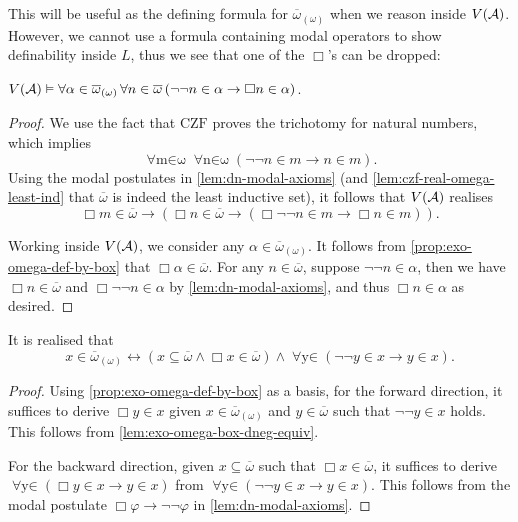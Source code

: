 \documentclass[12pt,openany]{book}
\theoremstyle{plain}
\theoremstyle{definition}
\newcommand\opA[1]{\mathop{\forall #1}}
\newcommand\CZF{\mathrm{CZF}}
\begin{document}
This will be useful as the defining formula for $\overline{\omega}_{(\omega)}$ when we reason inside $V\mleft(\mathcal{A}\mright)$. However, we cannot use a formula containing modal operators to show definability inside $L$, thus we see that one of the $\Box$'s can be dropped:

\begin{lemma}
  \label{lem:exo-omega-box-dneg-equiv}
  $V\mleft(\mathcal{A}\mright) \vDash \opA{\alpha \in \overline{\omega}_{(\omega)}} \opA{n \in \overline{\omega}} \left(\neg \neg n \in \alpha \rightarrow \Box n \in \alpha\right)$.
\end{lemma}

\begin{proof}
  We use the fact that $\CZF$ proves the trichotomy for natural numbers, which implies
  \[\opA{m \in \omega} \opA{n \in \omega} \left(\neg \neg n \in m \rightarrow n \in m\right).\]
  Using the modal postulates in \autoref{lem:dn-modal-axioms} (and \autoref{lem:czf-real-omega-least-ind} that $\overline{\omega}$ is indeed the least inductive set), it follows that $V\mleft(\mathcal{A}\mright)$ realises
  \[\Box m \in \overline{\omega} \rightarrow \left(\Box n \in \overline{\omega} \rightarrow \left(\Box \neg \neg n \in m \rightarrow \Box n \in m\right)\right).\]

  Working inside $V\mleft(\mathcal{A}\mright)$, we consider any $\alpha \in \overline{\omega}_{(\omega)}$. It follows from \autoref{prop:exo-omega-def-by-box} that $\Box \alpha \in \overline{\omega}$.
  For any $n \in \overline{\omega}$, suppose $\neg \neg n \in \alpha$, then we have $\Box n \in \overline{\omega}$ and $\Box \neg \neg n \in \alpha$ by \autoref{lem:dn-modal-axioms}, and thus $\Box n \in \alpha$ as desired.
\end{proof}

\begin{corollary}
  \label{cor:exo-omega-def-by-dneg}
  It is realised that
  \[x \in \overline{\omega}_{(\omega)} \leftrightarrow \left(x \subseteq \overline{\omega} \land \Box x \in \overline{\omega}\right) \land \opA{y \in \overline{\omega}} \left(\neg \neg y \in x \rightarrow y \in x\right).\]
\end{corollary}

\begin{proof}
  Using \autoref{prop:exo-omega-def-by-box} as a basis, for the forward direction, it suffices to derive $\Box y \in x$ given $x \in \overline{\omega}_{(\omega)}$ and $y \in \overline{\omega}$ such that $\neg \neg y \in x$ holds. This follows from \autoref{lem:exo-omega-box-dneg-equiv}.

  For the backward direction, given $x \subseteq \overline{\omega}$ such that $\Box x \in \overline{\omega}$, it suffices to derive $\opA{y \in \overline{\omega}} \left(\Box y \in x \rightarrow y \in x\right)$ from $\opA{y \in \overline{\omega}} \left(\neg \neg y \in x \rightarrow y \in x\right)$. This follows from the modal postulate $\Box \varphi \rightarrow \neg \neg \varphi$ in \autoref{lem:dn-modal-axioms}.
\end{proof}
\end{document}
